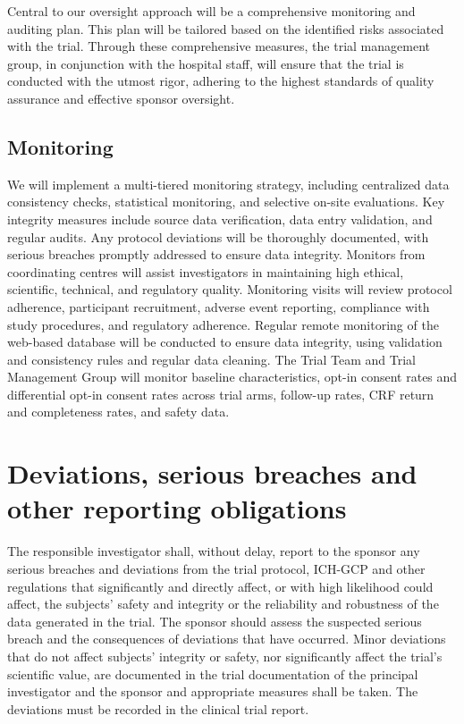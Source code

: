 \documentclass[
]{scrartcl}
\begin{document}
Central to our oversight approach will be a comprehensive monitoring and
auditing plan. This plan will be tailored based on the identified risks
associated with the trial. Through these comprehensive measures, the
trial management group, in conjunction with the hospital staff, will
ensure that the trial is conducted with the utmost rigor, adhering to
the highest standards of quality assurance and effective sponsor
oversight.

\hypertarget{monitoring}{%
\subsection{Monitoring}\label{monitoring}}

We will implement a multi-tiered monitoring strategy, including
centralized data consistency checks, statistical monitoring, and
selective on-site evaluations. Key integrity measures include source
data verification, data entry validation, and regular audits. Any
protocol deviations will be thoroughly documented, with serious breaches
promptly addressed to ensure data integrity. Monitors from coordinating
centres will assist investigators in maintaining high ethical,
scientific, technical, and regulatory quality. Monitoring visits will
review protocol adherence, participant recruitment, adverse event
reporting, compliance with study procedures, and regulatory adherence.
Regular remote monitoring of the web-based database will be conducted to
ensure data integrity, using validation and consistency rules and
regular data cleaning. The Trial Team and Trial Management Group will
monitor baseline characteristics, opt-in consent rates and differential
opt-in consent rates across trial arms, follow-up rates, CRF return and
completeness rates, and safety data.

\hypertarget{deviations-serious-breaches-and-other-reporting-obligations}{%
\section{Deviations, serious breaches and other reporting
obligations}\label{deviations-serious-breaches-and-other-reporting-obligations}}

The responsible investigator shall, without delay, report to the sponsor
any serious breaches and deviations from the trial protocol, ICH-GCP and
other regulations that significantly and directly affect, or with high
likelihood could affect, the subjects' safety and integrity or the
reliability and robustness of the data generated in the trial. The
sponsor should assess the suspected serious breach and the consequences
of deviations that have occurred. Minor deviations that do not affect
subjects' integrity or safety, nor significantly affect the trial's
scientific value, are documented in the trial documentation of the
principal investigator and the sponsor and appropriate measures shall be
taken. The deviations must be recorded in the clinical trial report.
\end{document}
